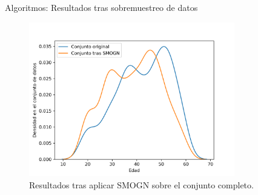 \documentclass{beamer}
\begin{document}
\begin{frame}{Algoritmos: Resultados tras sobremuestreo de datos}
		\begin{figure}[H]
			\centering
			\includegraphics[width=0.8\textwidth]{tras_sobremuestreo.png}
			\caption{Resultados tras aplicar SMOGN sobre el conjunto completo.}
			\label{fig:tras_sobremuestreo}
		\end{figure}

\end{frame}
\end{document}
